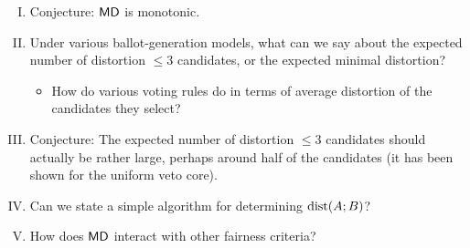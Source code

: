 \documentclass{amsart}
\DeclareMathOperator{\dist}{\rm{dist}}
\DeclareMathOperator{\MD}{\sf{MD}}
\begin{document}
\begin{enumerate}[(I)]
	\item Conjecture: $\MD$ is monotonic.
	\item Under various ballot-generation models, what can we say about the expected number of distortion $\leq 3$ candidates, or the expected minimal distortion?
	\begin{itemize}
		\item How do various voting rules do in terms of average distortion of the candidates they select?
	\end{itemize}
	\item Conjecture: The expected number of distortion $\leq 3$ candidates should actually be rather large, perhaps around half of the candidates (it has been shown for the uniform veto core).
	\item Can we state a simple algorithm for determining $\dist(A;B)$?
	\item How does $\MD$ interact with other fairness criteria?
\end{enumerate}
 
\printbibliography
\end{document}

